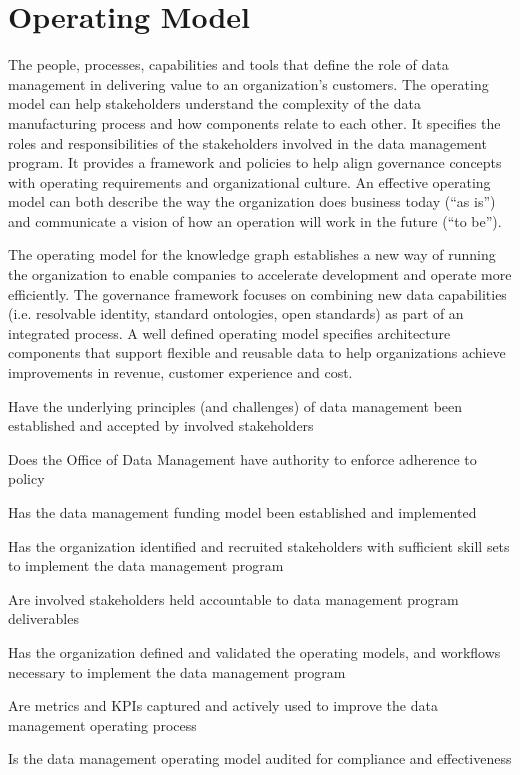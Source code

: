 \section{Operating Model}\label{sec:ekgmm-b-4-1} %

The people, processes, capabilities and tools that define the role of data management in delivering value to an organization’s customers.
The operating model can help stakeholders understand the complexity of the data manufacturing process and how components relate to each other.
It specifies the roles and responsibilities of the stakeholders involved in the data management program.
It provides a framework and policies to help align governance concepts with operating requirements and organizational culture.
An effective operating model can both describe the way the organization does business today (“as is”) and communicate a vision of how an operation will work in the future (“to be”).

\kgmmekgrationalesection

The operating model for the knowledge graph establishes a new way of running the organization to enable companies to accelerate development and operate more efficiently.
The  governance framework focuses on combining new data capabilities (i.e. resolvable identity, standard ontologies, open standards) as part of an integrated process.
A well defined operating model specifies architecture components that support flexible and reusable data to help organizations achieve improvements in revenue, customer experience and cost.

\kgmmcorequestionssection

\begin{core-questions}

  \item [\thesection.1] Have the underlying principles (and challenges) of data management been established and accepted by involved stakeholders
  \item [\thesection.2] Does the Office of Data Management have authority to enforce adherence to policy
  \item [\thesection.3] Has the data management funding model been established and implemented
  \item [\thesection.4] Has the organization identified and recruited stakeholders with sufficient skill sets to implement the data management program
  \item [\thesection.5] Are involved stakeholders held accountable to data management program deliverables
  \item [\thesection.6] Has the organization defined and validated the operating models, and workflows necessary to implement the data management program
  \item [\thesection.7] Are metrics and KPIs captured and actively used to improve the data management operating process
  \item [\thesection.8] Is the data management operating model audited for compliance and effectiveness

\end{core-questions}

